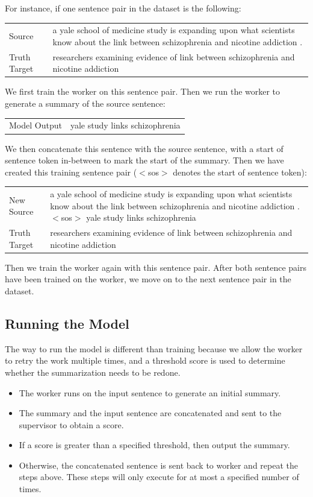 \documentclass[letterpaper]{article} %
\begin{document}
For instance, if one sentence pair in the dataset is the following:

\begin{center}
	\begin{tabular}{p{57pt} p{170pt}}
		Source & a yale school of medicine study is expanding upon what scientists know about the link between schizophrenia and nicotine addiction .\\
		Truth Target & researchers examining evidence of link between schizophrenia and nicotine addiction
	\end{tabular}
\end{center}

We first train the worker on this sentence pair. Then we run the worker to generate a summary of the source sentence:
\begin{center}
	\begin{tabular}{p{57pt} p{170pt}}
		Model Output & yale study links schizophrenia
	\end{tabular}
\end{center}

We then concatenate this sentence with the source sentence, with a start of sentence token in-between to mark the start of the summary. Then we have created this training sentence pair ($<$sos$>$ denotes the start of sentence token):
\begin{center}
	\begin{tabular}{p{57pt} p{170pt}}
		New Source & a yale school of medicine study is expanding upon what scientists know about the link between schizophrenia and nicotine addiction . $<$sos$>$ yale study links schizophrenia\\
		Truth Target & researchers examining evidence of link between schizophrenia and nicotine addiction
	\end{tabular}
\end{center}

Then we train the worker again with this sentence pair. After both sentence pairs have been trained on the worker, we move on to the next sentence pair in the dataset.

\subsection{Running the Model}
The way to run the model is different than training because we allow the worker to retry the work multiple times, and a threshold score is used to determine whether the summarization needs to be redone.
\begin{itemize}
	\item The worker runs on the input sentence to generate an initial summary.
	\item The summary and the input sentence are concatenated and sent to the supervisor to obtain a score.
	\item If a score is greater than a specified threshold, then output the summary.
	\item Otherwise, the concatenated sentence is sent back to worker and repeat the steps above. These steps will only execute for at most a specified number of times.
\end{itemize}
\end{document}
